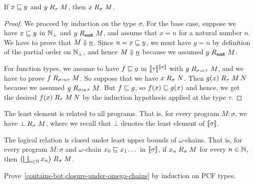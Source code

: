 \begin{lemma}\label{R-extend-left}
  If \(x \below y\) and \(y \logrel_\sigma M\), then \(x \logrel_\sigma M\).
\end{lemma}
\begin{proof}
  We proceed by induction on the type \(\sigma\).
  For the base case, suppose we have \(x \below y\) in \(\Nat_\bot\) and
  \(y \logrel_\pcfnat M\), and assume that \(x = n\) for a natural number
  \(n\). We have to prove that \(M \bigstep \numeral n\).
  Since \(n = x \below y\), we must have \(y = n\) by definition of the partial
  order on \(\Nat_\bot\), and hence \(M \bigstep \numeral n\) because we assumed
  \(y \logrel_\pcfnat M\).

  For function types, we assume to have \(f \below g\) in
  \(\densem{\tau}^{\densem{\sigma}}\) with
  \(g \logrel_{\sigma \pcffun \tau} M\), and we have to prove
  \(f \logrel_{\sigma \pcffun \tau} M\).
  So suppose that we have \(x \logrel_\sigma N\). Then
  \(g(x) \logrel_\tau M\,N\) because we assumed
  \(g \logrel_{\sigma \pcffun \tau} M\).
  But \(f \below g\), so \(f(x) \below g(x)\) and hence, we get the desired
  \(f(x) \logrel_\tau M\,N\) by the induction hypothesis applied at the type
  \(\tau\).
\end{proof}

\begin{lemma}\label{contains-bot}
  The least element is related to all programs.
  That is, for every program \(M : \sigma\), we have \(\bot \logrel_\sigma M\),
  where we recall that \(\bot\) denotes the least element of
  \(\densem{\sigma}\).
\end{lemma}
\begin{lemma}\label{closure-under-omega-chains}
  The logical relation is closed under least upper bounds of \(\omega\)-chains.
  That is, for every program \(M : \sigma\) and \(\omega\)-chain
  \(x_0 \below x_1 \dots\) in \(\densem{\sigma}\), if \(x_n \logrel_\sigma M\)
  for every \(n \in \Nat\), then \(\pa*{\bigsqcup_{n \in \Nat}x_n} \logrel_\sigma M\).
\end{lemma}

\begin{exercise}\label{exer:contains-bot-and-closure-under-omega-chains}
  Prove~\cref{contains-bot,closure-under-omega-chains} by induction on PCF
  types.
\end{exercise}

